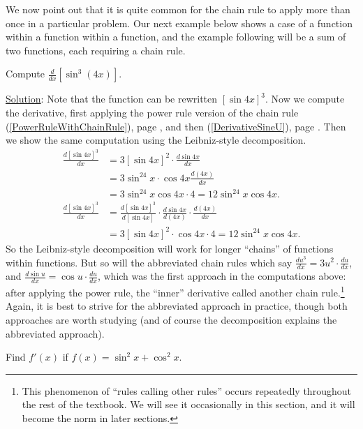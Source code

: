 We now point out that it is quite common for the chain
rule to apply more than once in a particular problem. 
Our next example below shows a case of a function
within a function within a function, and the example
following will be a sum of two functions, each requiring
a chain rule.

\bex Compute $\frac{d}{dx}\left[\sin^3(4x)\right]$.

\underline{Solution}:  Note that the function can be 
rewritten $\left[\sin4x\right]^3$.  
Now we compute the derivative, first applying the power rule
version of the chain rule (\ref{PowerRuleWithChainRule}), page
\pageref{PowerRuleWithChainRule}, and then 
(\ref{DerivativeSineU}), page \pageref{DerivativeSineU}.
Then we show the same computation using the Leibniz-style decomposition.
\begin{align*}
\frac{d[\sin4x]^3}{dx}&=3[\sin4x]^2\cdot\frac{d\sin4x}{dx}\\
                      &=3\sin^24x\cdot\cos4x\frac{d(4x)}{dx}\\
                      &=3\sin^24x\cos4x\cdot4=12\sin^24x\cos4x.\\
\frac{d[\sin4x]^3}{dx}
  &=\frac{d[\sin4x]^3}{d[\sin4x]}\cdot\frac{d\sin4x}{d(4x)}\cdot
                   \frac{d(4x)}{dx}\\
  &=3[\sin4x]^2\cdot\cos4x\cdot4=12\sin^24x\cos4x.\end{align*}
\eex
So the Leibniz-style decomposition will work for longer ``chains''
of functions within functions.  But so will the abbreviated 
chain rules which say $\frac{du^3}{dx}=3u^2\cdot\frac{du}{dx}$,
and $\frac{d\sin u}{dx}=\cos u\cdot\frac{du}{dx}$, which was
the first approach in the computations above: after applying
the power rule, the ``inner'' derivative called another
chain rule.\footnote{%
This phenomenon of ``rules calling other rules'' occurs repeatedly
throughout the rest of the textbook.  We will see it occasionally
in this section, and it will become the norm in later sections.
}
  Again, it is best
to strive for the abbreviated approach in practice, though
both approaches are worth studying (and of course the decomposition
explains the abbreviated approach).

\bex Find $f'(x)$ if $f(x)=\sin^2x+\cos^2x$.

